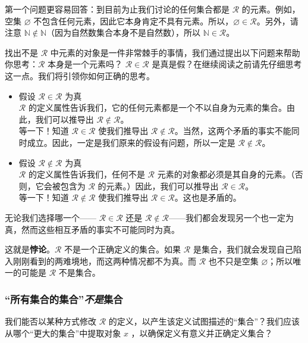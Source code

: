 第一个问题更容易回答：到目前为止我们讨论的任何集合都是 $\mathcal{R}$ 的元素。例如，空集 $\varnothing$ 不包含任何元素，因此它本身肯定不具有元素。所以，$\varnothing \in \mathcal{R}$。另外，请注意 $\mathbb{N} \notin \mathbb{N}$（因为自然数集合本身不是自然数），所以 $\mathbb{N} \in \mathcal{R}$。

找出不是 $\mathcal{R}$ 中元素的对象是一件非常棘手的事情，我们通过提出以下问题来帮助你思考：$\mathcal{R}$ 本身是一个元素吗？ $\mathcal{R} \in \mathcal{R}$ 是真是假？在继续阅读之前请先仔细思考这一点。我们将引领你如何正确的思考。

\begin{itemize}
    \item 假设 $\mathcal{R} \in \mathcal{R}$ 为真 \\
    $\mathcal{R}$ 的定义属性告诉我们，它的任何元素都是一个不以自身为元素的集合。由此，我们可以推导出 $\mathcal{R} \notin \mathcal{R}$。\\
    等一下！知道 $\mathcal{R} \in \mathcal{R}$ 使我们推导出 $\mathcal{R} \notin \mathcal{R}$。当然，这两个矛盾的事实不能同时成立。因此，一定是我们原来的假设有问题，所以一定是 $\mathcal{R} \notin \mathcal{R}$。
    \item 假设 $\mathcal{R} \notin \mathcal{R}$ 为真 \\
    $\mathcal{R}$ 的定义属性告诉我们，任何不是 $\mathcal{R}$ 元素的对象都必须是其自身的元素。（否则，它会被包含为 $\mathcal{R}$ 的元素。）因此，我们可以推导出 $\mathcal{R} \in \mathcal{R}$。\\
    等一下！知道 $\mathcal{R} \notin \mathcal{R}$ 使我们推导出 $\mathcal{R} \in \mathcal{R}$。这也是矛盾的。
\end{itemize}
无论我们选择哪一个—— $\mathcal{R} \in \mathcal{R}$ 还是 $\mathcal{R} \notin \mathcal{R}$——我们都会发现另一个也一定为真，然而这些相互矛盾的事实不可能同时为真。

这就是\textbf{悖论}。$\mathcal{R}$ 不是一个正确定义的集合。如果 $\mathcal{R}$ 是集合，我们就会发现自己陷入刚刚看到的两难境地，而这两种情况都不为真。而 $\mathcal{R}$ 也不只是空集 $\varnothing$；所以唯一的可能是 $\mathcal{R}$ 不是集合。

\subsubsection*{``所有集合的集合''\emph{不是}集合}

我们能否以某种方式修改 $\mathcal{R}$ 的定义，以产生该定义试图描述的``集合''？我们应该从哪个``更大的集合''中提取对象 $x$ ，以确保定义有意义并正确定义集合？

